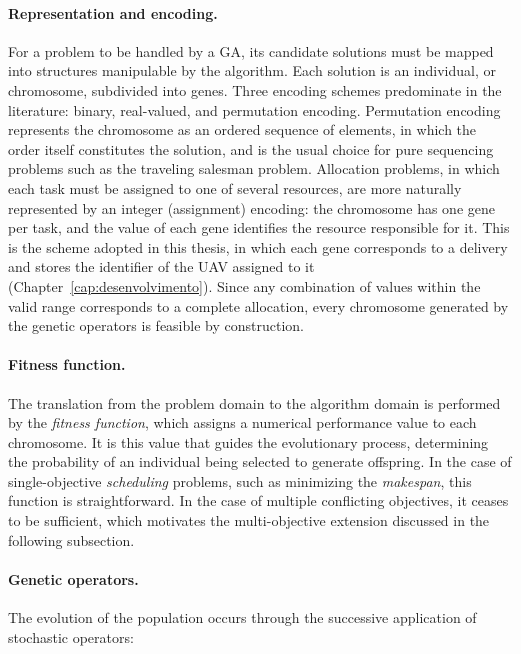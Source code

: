 \paragraph{Representation and encoding.} For a problem to be handled by a GA, its candidate solutions must be mapped into structures manipulable by the algorithm. Each solution is an individual, or chromosome, subdivided into genes. Three encoding schemes predominate in the literature: binary, real-valued, and permutation encoding. Permutation encoding represents the chromosome as an ordered sequence of elements, in which the order itself constitutes the solution, and is the usual choice for pure sequencing problems such as the traveling salesman problem. Allocation problems, in which each task must be assigned to one of several resources, are more naturally represented by an integer (assignment) encoding: the chromosome has one gene per task, and the value of each gene identifies the resource responsible for it. This is the scheme adopted in this thesis, in which each gene corresponds to a delivery and stores the identifier of the UAV assigned to it (Chapter~\ref{cap:desenvolvimento}). Since any combination of values within the valid range corresponds to a complete allocation, every chromosome generated by the genetic operators is feasible by construction.

\paragraph{Fitness function.} The translation from the problem domain to the algorithm domain is performed by the \textit{fitness function}, which assigns a numerical performance value to each chromosome. It is this value that guides the evolutionary process, determining the probability of an individual being selected to generate offspring. In the case of single-objective \textit{scheduling} problems, such as minimizing the \textit{makespan}, this function is straightforward. In the case of multiple conflicting objectives, it ceases to be sufficient, which motivates the multi-objective extension discussed in the following subsection.

\paragraph{Genetic operators.} The evolution of the population occurs through the successive application of stochastic operators:

